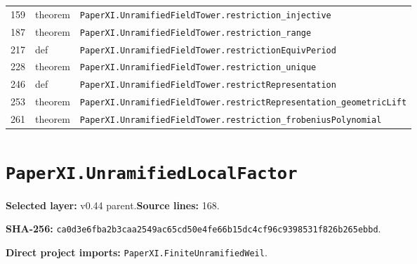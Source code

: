 \documentclass[10pt,oneside]{book}
\begin{document}
\begin{longtable}{@{}p{}p{}p{}@{}}
159&theorem&\nolinkurl{PaperXI.UnramifiedFieldTower.restriction_injective}\\

187&theorem&\nolinkurl{PaperXI.UnramifiedFieldTower.restriction_range}\\

217&def&\nolinkurl{PaperXI.UnramifiedFieldTower.restrictionEquivPeriod}\\

228&theorem&\nolinkurl{PaperXI.UnramifiedFieldTower.restriction_unique}\\

246&def&\nolinkurl{PaperXI.UnramifiedFieldTower.restrictRepresentation}\\

253&theorem&\nolinkurl{PaperXI.UnramifiedFieldTower.restrictRepresentation_geometricLift}\\

261&theorem&\nolinkurl{PaperXI.UnramifiedFieldTower.restriction_frobeniusPolynomial}\\

\bottomrule\end{longtable}

\section{\texorpdfstring{\nolinkurl{PaperXI.UnramifiedLocalFactor}}{PaperXI.UnramifiedLocalFactor}}\label{module:PaperXI.UnramifiedLocalFactor}

\textbf{Selected layer:} v0.44 parent.\quad\textbf{Source lines:} 168.\par\textbf{SHA-256:} {\scriptsize\nolinkurl{ca0d3e6fba2b3caa2549ac65cd50e4fe66b15dc4cf96c9398531f826b265ebbd}}.


\textbf{Direct project imports:} \nolinkurl{PaperXI.FiniteUnramifiedWeil}.
\end{document}
